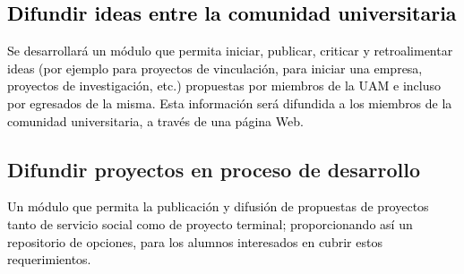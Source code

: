 \documentclass[11pt,letterpaper,titlepage]{article}
\begin{document}

\textcolor{black}{
\subsection{Difundir ideas entre la comunidad universitaria}
Se desarrollar\'a un m\'odulo que permita iniciar, publicar, criticar y retroalimentar ideas (por ejemplo para proyectos de vinculaci\'on, para iniciar una empresa, proyectos de investigaci\'on, etc.) propuestas por miembros de la UAM e incluso por egresados de la misma. Esta informaci\'on ser\'a difundida a los miembros de la comunidad universitaria, a trav\'es de una p\'agina Web.}




\subsection{Difundir proyectos en proceso de desarrollo}
\textcolor{black}{
Un m\'odulo que permita la publicaci\'on y difusi\'on de propuestas de proyectos tanto de servicio social como de proyecto terminal; proporcionando as\'i un repositorio de opciones, para los alumnos interesados en cubrir estos requerimientos.}
\end{document}
